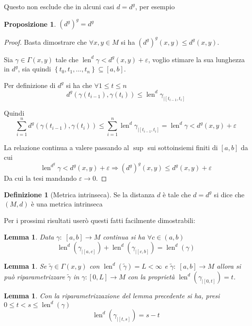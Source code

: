 \documentclass[a4paper,10pt]{article}
\newcounter{counter1}
\theoremstyle{plain}
\newtheorem{mylem}[counter1]{Lemma}
\newtheorem{mypro}[counter1]{Proposizione}
\theoremstyle{definition}
\newtheorem{mydef}[counter1]{Definizione}
\theoremstyle{remark}
\newcommand{\set}[1]{\left\{#1\right\}}
\newcommand{\pa}[1]{\left(#1\right)}
\newcommand{\bra}[1]{\left[#1\right]}
\DeclareMathOperator{\len}{len}
\begin{document}
Questo non esclude che in alcuni casi $d = d^g$, per esempio
\begin{mypro}
  $\pa{d^g}^g = d^g$
\end{mypro}
\begin{proof}
  Basta dimostrare che $\forall x,y \in M$ si ha $\pa{d^g}^g(x,y) \le
  d^g(x,y)$.

  Sia $\gamma \in \Gamma(x,y)$ tale che $\len ^d \gamma <
  d^g(x,y) + \varepsilon$, voglio stimare la sua lunghezza in $d^g$,
  sia quindi $\set{t_0,t_1,...,t_n} \subseteq \bra{a,b}$.

  Per definizione di $d^g$ si ha che $\forall 1\le t \le n$
  \[ d^g(\gamma( t_{i-1}) , \gamma (t_i) ) \le \len ^d \gamma _{| \bra
    { t_{i-1} , t_i} } \]

  Quindi
  \[ \sum _{i=1} ^n d^g(\gamma(t_{i-1}),\gamma(t_i)) \le \sum _{i=1}
  ^n \len ^d \gamma_{|\bra{t_{i-1},t_i}} = \len ^d \gamma < d^g(x,y)
  + \varepsilon  \]

  La relazione continua a valere passando al $\sup$ sui sottoinsiemi
  finiti di $\bra{a,b}$ da cui
  \[ \len ^{d^g} \gamma < d^g(x,y) + \varepsilon \Rightarrow
  \pa{d^g}^g (x,y) \le d^g(x,y) + \varepsilon \]
  Da cui la tesi mandando $\varepsilon \to 0$.
\end{proof}

\begin{mydef}[Metrica intrinseca]
  Se la distanza $d$ è tale che $d = d^g$ si dice che $(M,d)$ è una
  metrica intrinseca
\end{mydef}

Per i prossimi risultati userò questi fatti facilmente dimostrabili:
\begin{mylem}
  Data $\gamma:\; \bra{a,b} \to M$ continua si ha $\forall c \in
  \pa{a,b}$
  \[ \len ^d (\gamma_{|\bra{a,c}}) +  \len ^d (\gamma_{|\bra{c,b}}) = 
  \len ^d (\gamma) \] 
\end{mylem}
\begin{mylem}
  Se $\tilde \gamma \in \Gamma (x,y)$ con $\len ^d (\tilde \gamma) = L
  < \infty$ e $\tilde \gamma : \; \bra {a,b} \to M$ allora si può
  riparametrizzare $\tilde \gamma$ in $\gamma : \bra{0,L} \to M$ con la
  proprietà $\len ^d(\gamma_{| \bra{0,t}}) = t$.
\end{mylem}
\begin{mylem}
  Con la riparametrizzazione del lemma precedente si ha, presi $0 \le
  t < s \le \len ^d (\gamma)$
  \[ \len ^d (\gamma _{|\bra{t,s}}) = s - t \]
\end{mylem}
\end{document}
